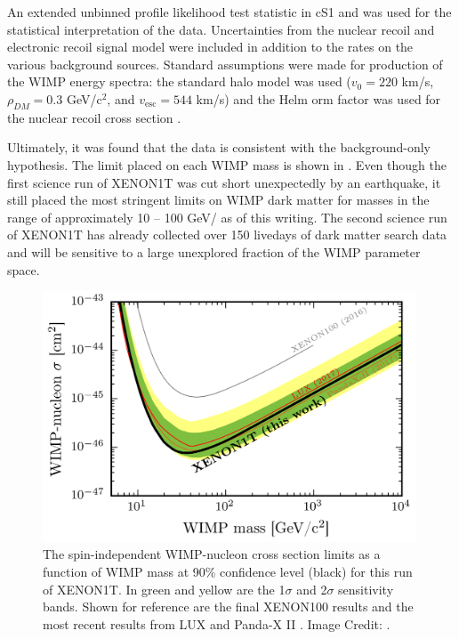 An extended unbinned profile likelihood test statistic in cS1 and \csbottom{} was used for the statistical interpretation of the data.  Uncertainties from the nuclear recoil and electronic recoil signal model were included in addition to the rates on the various background sources.  Standard assumptions were made for production of the WIMP energy spectra: the standard halo model was used ($v_0 = 220$ km/s, $\rho_{DM} = 0.3$ GeV/$\textrm{c}^2$, and $v_{\textrm{esc}} = 544$ km/s) and the Helm orm factor was used for the nuclear recoil cross section \cite{engel1991nuclear, lewin1996review}.

Ultimately, it was found that the data is consistent with the background-only hypothesis.  The limit placed on each WIMP mass is shown in .  Even though the first science run of XENON1T was cut short unexpectedly by an earthquake, it still placed the most stringent limits on WIMP dark matter for masses in the range of approximately 10 -- 100 GeV/\csquared{} as of this writing.  The second science run of XENON1T has already collected over 150 livedays of dark matter search data and will be sensitive to a large unexplored fraction of the WIMP parameter space.

\begin{figure}[p]
	\centering
	\includegraphics[width=0.99\textwidth]{xe1t_sr0_limit}
	\caption{ The spin-independent WIMP-nucleon cross section limits as a function of WIMP mass at 90\% confidence level (black) for this run of XENON1T. In green and yellow are the 1$\sigma$ and 2$\sigma$ sensitivity bands.  Shown for reference are the final XENON100 results \cite{aprile2016xenon100} and the most recent results from LUX \cite{akerib2017results} and Panda-X II \cite{collaboration2017dark}.  Image Credit: .}
	\label{fig:xe1t_sr0_limit}
\end{figure}






